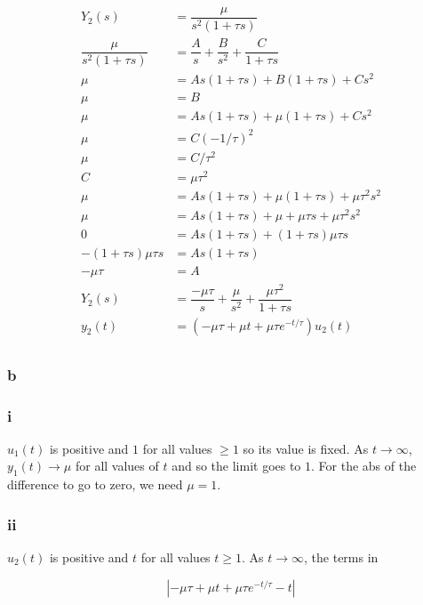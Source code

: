 \documentclass[11pt]{article}
\begin{document}
\begin{align*}
    Y_2(s) &= \dfrac{\mu}{s^2(1 + \tau s)} \\
    \dfrac{\mu}{s^2(1 + \tau s)} &= \dfrac{A}{s} + \dfrac{B}{s^2} + \dfrac{C}{1 + \tau s} \\
    \mu &= A s(1 + \tau s) + B(1 + \tau s) + Cs^2 \\
    \mu &= B \tag{$s = 0$} \\
    \mu &= A s (1 + \tau s) + \mu (1 + \tau s) + Cs^2 \\
    \mu &= C (-1/\tau)^2 \tag{$s = -1/\tau$} \\
    \mu &= C / \tau^2 \\
    C &= \mu \tau^2 \\
    \mu &= As(1 + \tau s) + \mu (1 + \tau s) + \mu \tau^2 s^2 \\
    \mu &= As(1 + \tau s) + \mu + \mu \tau s + \mu \tau^2 s^2 \\
    0 &= As (1 + \tau s) + (1 + \tau s) \mu \tau s \\
    - (1 + \tau s) \mu \tau s &= As (1 + \tau s) \\
    - \mu \tau &= A \\
    Y_2(s) &= \dfrac{-\mu \tau}{s} + \dfrac{\mu}{s^2} + \dfrac{\mu \tau^2}{1 + \tau s} \\
    y_2(t) &= (-\mu \tau + \mu t + \mu \tau e^{-t / \tau}) u_2(t) \\ 
\end{align*}

\subsubsection{b}

\subsubsection{i}

$u_1(t)$ is positive and $1$ for all values $\geq 1$ so its value is fixed. As $t \to \infty$, $y_1(t) \to \mu$ for all values of $t$ and so the limit goes to $1$. For the abs of the difference to go to zero, we need $\mu = 1$.

\subsubsection{ii}

$u_2(t)$ is positive and $t$ for all values $t \geq 1$. As $t \to \infty$, the terms in

\[ | -\mu\tau + \mu t + \mu \tau e^{-t/\tau} - t | \]
\end{document}

